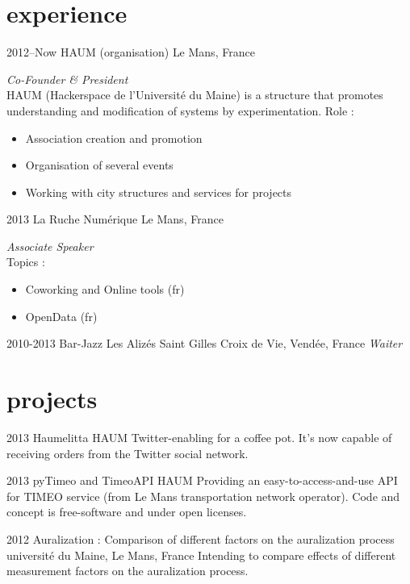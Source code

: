 \documentclass[]{friggeri-cv} %
\begin{document}

\section{experience}

\begin{entrylist}
\entry
{2012--Now}
{HAUM (organisation)}
{Le Mans, France}
{\emph{Co-Founder \& President} \\
HAUM (Hackerspace de l'Université du Maine) is a structure that promotes
understanding and modification of systems by experimentation.
Role :
\begin{itemize}
    \item Association creation and promotion
    \item Organisation of several events
    \item Working with city structures and services for projects
\end{itemize}
}
\entry
{2013}
{La Ruche Numérique}
{Le Mans, France}
{\emph{Associate Speaker}\\
Topics :
\begin{itemize}
    \item Coworking and Online tools (fr)
    \item OpenData (fr)
\end{itemize}}
\entry
{2010-2013}
{Bar-Jazz Les Alizés}
{Saint Gilles Croix de Vie, Vendée, France}
{\emph{Waiter}}
\end{entrylist}


\section{projects}

\begin{entrylist}
\entry
{2013}
{Haumelitta}
{HAUM}
{Twitter-enabling for a coffee pot. It's now capable of receiving orders from the Twitter social network.}

\entry
{2013}
{pyTimeo and TimeoAPI}
{HAUM}
{Providing an easy-to-access-and-use API for TIMEO service (from Le Mans transportation network operator).
Code and concept is free-software and under open licenses.}

\entry
{2012}
{Auralization : Comparison of different factors on the auralization process}
{université du Maine, Le Mans, France}
{Intending to compare effects of different measurement factors on the auralization process.}
\end{entrylist}
\end{document}

